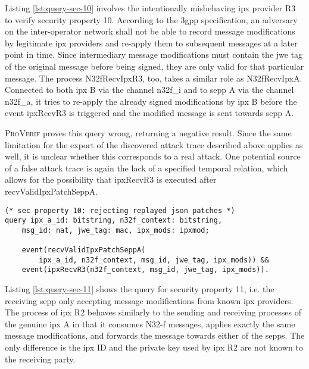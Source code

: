 Listing \ref{lst:query-sec-10} involves the intentionally misbehaving \gls{ipx} provider R3 to verify security property 10.
According to the \gls{3gpp} specification, an adversary on the inter-operator network shall not be able to record message modifications by legitimate \gls{ipx} providers and re-apply them to subsequent messages at a later point in time.
Since intermediary message modifications must contain the \gls{jwe} tag of the original message before being signed, they are only valid for that particular message.
The process {\sffamily N32fRecvIpxR3}, too, takes a similar role as {\sffamily N32fRecvIpxA}.
Connected to both \gls{ipx} B via the channel {\sffamily n32f\_i} and to \gls{sepp} A via the channel {\sffamily n32f\_a}, it tries to re-apply the already signed modifications by \gls{ipx} B before the event {\sffamily ipxRecvR3} is triggered and the modified message is sent towards \gls{sepp} A.

\textsc{ProVerif} proves this query wrong, returning a negative result.
Since the same limitation for the export of the discovered attack trace described above applies as well, it is unclear whether this corresponds to a real attack.
One potential source of a false attack trace is again the lack of a specified temporal relation, which allows for the possibility that {\sffamily ipxRecvR3} is executed after {\sffamily recvValidIpxPatchSeppA}.

\begin{lstlisting}[caption={Query for security property 10},label={lst:query-sec-10},firstnumber=367]
(* sec property 10: rejecting replayed json patches *)
query ipx_a_id: bitstring, n32f_context: bitstring,
    msg_id: nat, jwe_tag: mac, ipx_mods: ipxmod;

    event(recvValidIpxPatchSeppA(
        ipx_a_id, n32f_context, msg_id, jwe_tag, ipx_mods)) &&
    event(ipxRecvR3(n32f_context, msg_id, jwe_tag, ipx_mods)).
\end{lstlisting}

Listing \ref{lst:query-sec-11} shows the query for security property 11, i.e. the receiving \gls{sepp} only accepting message modifications from known \gls{ipx} providers.
The process of \gls{ipx} R2 behaves similarly to the sending and receiving processes of the genuine \gls{ipx} A in that it consumes N32-f messages, applies exactly the same message modifications, and forwards the message towards either of the \glspl{sepp}.
The only difference is the \gls{ipx} ID and the private key used by \gls{ipx} R2 are not known to the receiving party.

